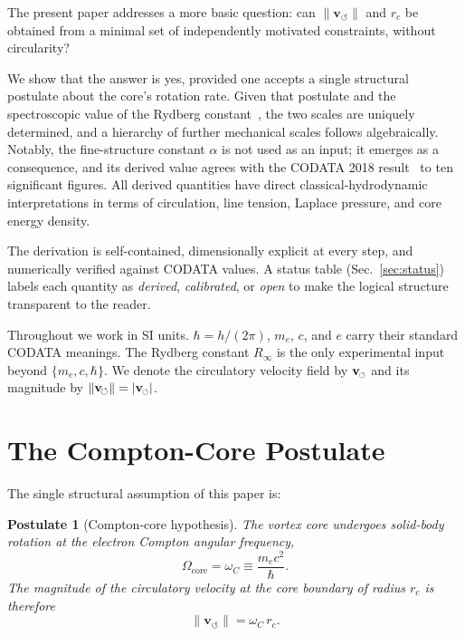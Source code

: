 \documentclass[aps,pra,preprint,longbibliography,nofootinbib]{revtex4-2}
\newtheorem{postulate}{Postulate}
\newcommand{\rotarrow}{%
  \mathchoice{\mkern-2mu\scriptstyle\boldsymbol{\circlearrowleft}}%
             {\mkern-2mu\scriptstyle\boldsymbol{\circlearrowleft}}%
             {\mkern-2mu\scriptscriptstyle\boldsymbol{\circlearrowleft}}%
             {\mkern-2mu\scriptscriptstyle\boldsymbol{\circlearrowleft}}}
\newcommand{\vc}{\mathbf{v}_{\rotarrow}}        %
\newcommand{\vnorm}{\lVert\mathbf{v}_{\!\boldsymbol{\circlearrowleft}}\rVert} %
\newcommand{\rc}{r_c}                            %
\newcommand{\omC}{\omega_C}                      %
\newcommand{\Rinf}{R_\infty}                     %
\begin{document}
The present paper addresses a more basic question: can $\vnorm$ and $\rc$
be obtained from a minimal set of independently motivated constraints,
without circularity?

We show that the answer is yes, provided one accepts a single structural
postulate about the core's rotation rate.
Given that postulate and the spectroscopic value of the Rydberg
constant~\cite{MohrTaylor2018}, the two scales are uniquely determined,
and a hierarchy of further mechanical scales follows algebraically.
Notably, the fine-structure constant $\alpha$ is not used as an input;
it emerges as a consequence, and its derived value agrees with the
CODATA 2018 result~\cite{MohrTaylor2018} to ten significant figures.
All derived quantities have direct classical-hydrodynamic
interpretations in terms of circulation, line tension, Laplace
pressure, and core energy density.

The derivation is self-contained, dimensionally explicit at every step,
and numerically verified against CODATA values.
A status table (Sec.~\ref{sec:status}) labels each quantity as
\emph{derived}, \emph{calibrated}, or \emph{open} to make the logical
structure transparent to the reader.

Throughout we work in SI units.
$\hbar = h/(2\pi)$, $m_e$, $c$, and $e$ carry their standard CODATA
meanings.
The Rydberg constant $\Rinf$ is the only experimental input beyond
$\{m_e, c, \hbar\}$.
We denote the circulatory velocity field by $\vc$ and its magnitude
by $\vnorm = \lvert\vc\rvert$.

\section{The Compton-Core Postulate}
\label{sec:postulate}

The single structural assumption of this paper is:

\begin{postulate}[Compton-core hypothesis]
\label{post:compton}
The vortex core undergoes solid-body rotation at the electron Compton
angular frequency,
\begin{equation}
  \Omega_{\mathrm{core}} = \omC \equiv \frac{m_e c^2}{\hbar}.
  \label{eq:postulate}
\end{equation}
The magnitude of the circulatory velocity at the core boundary
of radius $\rc$ is therefore
\begin{equation}
  \vnorm = \omC\,\rc.
  \label{eq:vc_rc_link}
\end{equation}
\end{postulate}
\end{document}
